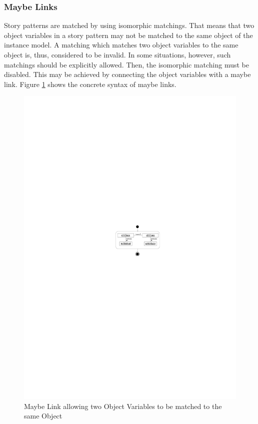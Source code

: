 \subsubsection{Maybe Links}
\label{sec:StoryPatterns:specialLinks:maybeLink}

Story patterns are matched by using isomorphic matchings. That means that two object variables in a story pattern may not be matched to the same object of the instance model. A matching which matches two object variables to the same object is, thus, considered to be invalid. In some situations, however, such matchings should be explicitly allowed. Then, the isomorphic matching must be disabled. This may be achieved by connecting the object variables with a maybe link. Figure \ref{fig:maybeLink} shows the concrete syntax of maybe links. 

\begin{figure}[htbp]
  \centering
  \includegraphics[scale=.8]{figures/MaybeLink}
  \caption{Maybe Link allowing two Object Variables to be matched to the same Object}
  \label{fig:maybeLink}
\end{figure}


